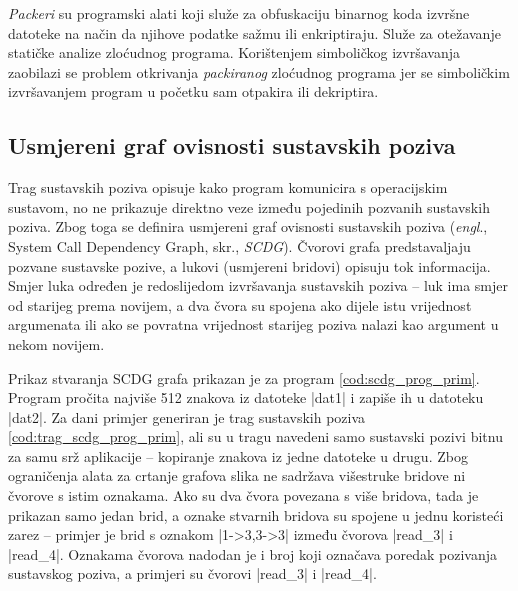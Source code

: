 \pagebreak

\textit{Packeri} su programski alati koji služe za obfuskaciju binarnog koda
izvršne datoteke na način da njihove podatke sažmu ili enkriptiraju. Služe za
otežavanje statičke analize zloćudnog programa. Korištenjem simboličkog 
izvršavanja zaobilazi se problem otkrivanja \textit{packiranog} zloćudnog 
programa jer se simboličkim izvršavanjem program u početku sam otpakira ili
dekriptira.


\subsection{Usmjereni graf ovisnosti sustavskih poziva} %

Trag sustavskih poziva opisuje kako program komunicira s operacijskim sustavom,
no ne prikazuje direktno veze između pojedinih pozvanih sustavskih poziva. Zbog
toga se definira usmjereni graf ovisnosti sustavskih poziva (\textit{engl}., 
System Call Dependency Graph, skr., \textit{SCDG}). Čvorovi grafa 
predstavaljaju pozvane sustavske pozive, a lukovi (usmjereni bridovi) opisuju
tok informacija. Smjer luka određen je redoslijedom izvršavanja sustavskih 
poziva -- luk ima smjer od starijeg prema novijem, a dva čvora su spojena ako
dijele istu vrijednost argumenata ili ako se povratna vrijednost starijeg poziva
nalazi kao argument u nekom novijem.

Prikaz stvaranja SCDG grafa prikazan je za program \ref{cod:scdg_prog_prim}.
Program pročita najviše 512 znakova iz datoteke \inlinecode|dat1| i zapiše ih u
datoteku \inlinecode|dat2|. Za dani primjer generiran je trag sustavskih
poziva \ref{cod:trag_scdg_prog_prim}, ali su u tragu navedeni samo sustavski
pozivi bitnu za samu srž aplikacije -- kopiranje znakova iz jedne datoteke u
drugu. Zbog ograničenja alata za crtanje grafova slika ne sadržava višestruke
bridove ni čvorove s istim oznakama. Ako su dva čvora povezana s
više bridova, tada je prikazan samo jedan brid, a oznake stvarnih bridova su
spojene u jednu koristeći zarez -- primjer je brid s oznakom
\inlinecode|1->3,3->3| između čvorova \inlinecode|read_3| i 
\inlinecode|read_4|. Oznakama čvorova nadodan je i broj koji označava poredak
pozivanja sustavskog poziva, a primjeri su čvorovi \inlinecode|read_3| i 
\inlinecode|read_4|.

\newpage


